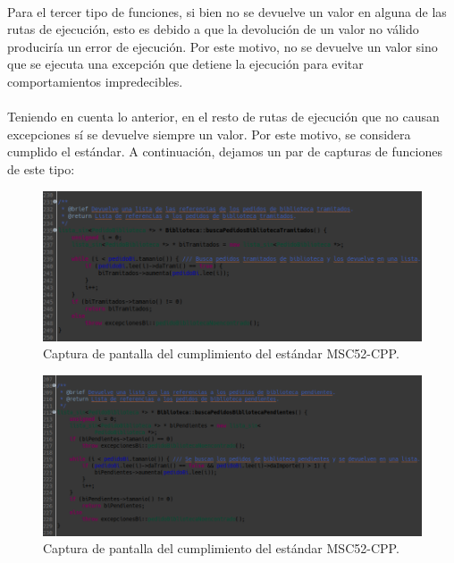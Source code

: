 			\paragraph{}Para el tercer tipo de funciones, si bien no se devuelve un valor en alguna de las rutas de ejecución, esto es debido a que la devolución de un valor no válido produciría un error de ejecución. Por este motivo, no se devuelve un valor sino que se ejecuta una excepción que detiene la ejecución para evitar comportamientos impredecibles.
			
			\paragraph{}Teniendo en cuenta lo anterior, en el resto de rutas de ejecución que no causan excepciones sí se devuelve siempre un valor. Por este motivo, se considera cumplido el estándar. A continuación, dejamos un par de capturas de funciones de este tipo: 
			
			\begin{figure}[H]
				\centering
				\includegraphics[scale=0.5]{img/captura36.png}
				\caption{Captura de pantalla del cumplimiento del estándar MSC52-CPP.}
				\label{captura36}
			\end{figure}
			
			\begin{figure}[H]
				\centering
				\includegraphics[scale=0.45]{img/captura37.png}
				\caption{Captura de pantalla del cumplimiento del estándar MSC52-CPP.}
				\label{captura37}
			\end{figure}

	

\newpage